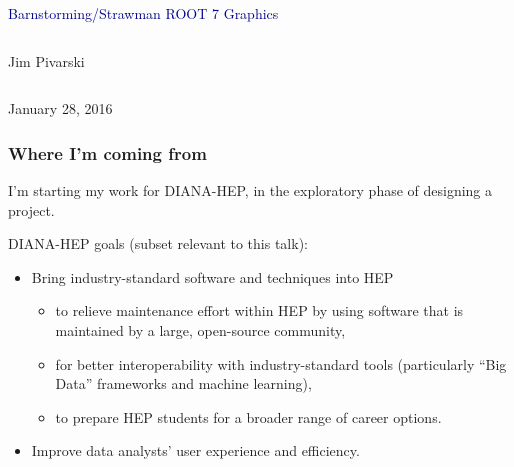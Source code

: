 \documentclass[compress]{beamer}
\begin{document}
\begin{frame}
\vfill
\begin{center}
\textcolor{darkblue}{\Large Barnstorming/Strawman ROOT 7 Graphics}

\vfill
\begin{columns}
\begin{center}
\large
Jim Pivarski
\end{center}
\end{columns}


\vfill
January 28, 2016

\end{center}
\end{frame}

\small

\begin{frame}
\frametitle{Where I'm coming from}
I'm starting my work for DIANA-HEP, in the exploratory phase of designing a project.

\vfill
DIANA-HEP goals (subset relevant to this talk):
\begin{itemize}
\item Bring industry-standard software and techniques into HEP
\begin{itemize}
\item to relieve maintenance effort within HEP by using software that is maintained by a large, open-source community,
\item for better interoperability with industry-standard tools (particularly ``Big Data'' frameworks and machine learning),
\item to prepare HEP students for a broader range of career options.
\end{itemize}
\item Improve data analysts' user experience and efficiency.
\end{itemize}
\end{frame}
\end{document}
